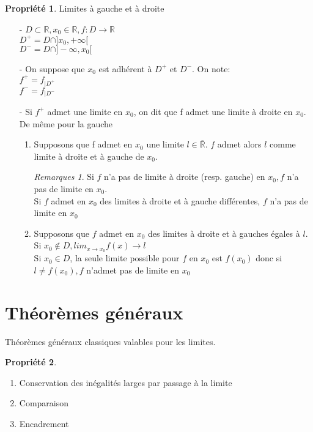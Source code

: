 \documentclass[fleqn]{article}
\theoremstyle{definition} \newtheorem*{defi}{D\'efinition}
\theoremstyle{definition} \newtheorem*{theo}{Th\'eor\`eme}
\theoremstyle{definition} \newtheorem*{prop}{Propri\'et\'e}
\theoremstyle{remark} \newtheorem*{rqs}{Remarques}
\begin{document}
\begin{prop} Limites \`a gauche et \`a droite
	\begin{itemize}
		\item [-] $D \subset \mathbb{R}, x_0 \in \mathbb{R}, f:D \rightarrow \mathbb{R}$ \\
			$D^+ = D \cap ]x_0, +\infty[$ \\
			$D^- = D \cap ]-\infty, x_0[$
		\item [-] On suppose que $x_0$ est adh\'erent \`a $D^+$ et $D^-$. On note: \\
			$f^+ = f_{|D^+}$ \\
			$f^- = f_{|D^-}$
		\item [-] Si $f^+$ admet une limite en $x_0$, on dit que f admet une limite \`a droite en $x_0$. De m\^eme pour la gauche
		\begin{enumerate}
			\item Supposons que f admet en $x_0$ une limite $l \in \overline{\mathbb{R}}$. $f$ admet alors $l$ comme limite \`a droite
				et \`a gauche de $x_0$.
				\begin{rqs}
					Si $f$ n'a pas de limite \`a droite (resp. gauche) en $x_0, f$ n'a pas de limite en $x_0$. \\
					Si $f$ admet en $x_0$ des limites \`a droite et \`a gauche diff\'erentes, $f$ n'a pas de limite en $x_0$
				\end{rqs}
			\item Supposons que $f$ admet en $x_0$ des limites \`a droite et \`a gauches \'egales \`a $l$. \\
				Si $x_0 \notin D, lim_{x \to x_0} f(x) \rightarrow l$ \\
				Si $x_0 \in D$, la seule limite possible pour $f$ en $x_0$ est $f(x_0)$ donc si $l \neq f(x_0), f$ n'admet pas de limite
				en $x_0$
		\end{enumerate}
	\end{itemize}
\end{prop}

\section{Th\'eor\`emes g\'en\'eraux}
Th\'eor\`emes g\'en\'eraux classiques valables pour les limites.
\begin{prop} $ $
	\begin{enumerate}
		\item Conservation des in\'egalit\'es larges par passage \`a la limite
		\item Comparaison
		\item Encadrement
	\end{enumerate}
\end{prop}
\end{document}

